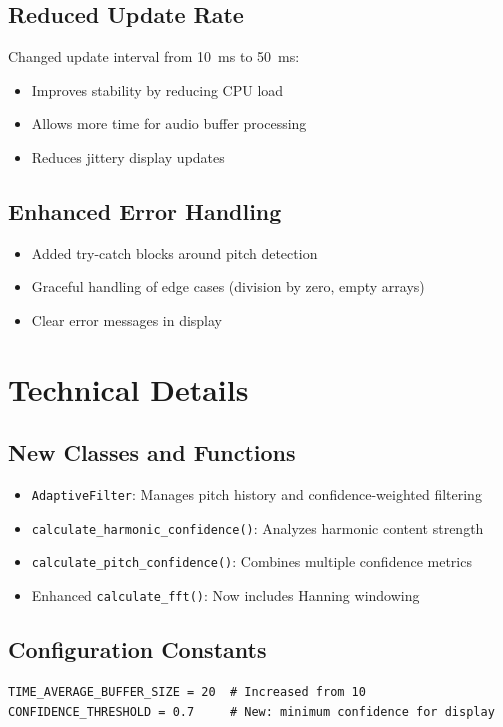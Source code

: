 \documentclass[11pt,a4paper]{article}
\begin{document}
\subsection{Reduced Update Rate}
Changed update interval from \SI{10}{\milli\second} to \SI{50}{\milli\second}:
\begin{itemize}
    \item Improves stability by reducing CPU load
    \item Allows more time for audio buffer processing
    \item Reduces jittery display updates
\end{itemize}

\subsection{Enhanced Error Handling}
\begin{itemize}
    \item Added try-catch blocks around pitch detection
    \item Graceful handling of edge cases (division by zero, empty arrays)
    \item Clear error messages in display
\end{itemize}

\section{Technical Details}

\subsection{New Classes and Functions}
\begin{itemize}
    \item \texttt{AdaptiveFilter}: Manages pitch history and confidence-weighted filtering
    \item \texttt{calculate\_harmonic\_confidence()}: Analyzes harmonic content strength
    \item \texttt{calculate\_pitch\_confidence()}: Combines multiple confidence metrics
    \item Enhanced \texttt{calculate\_fft()}: Now includes Hanning windowing
\end{itemize}

\subsection{Configuration Constants}
\begin{lstlisting}[caption=New Configuration Parameters]
TIME_AVERAGE_BUFFER_SIZE = 20  # Increased from 10
CONFIDENCE_THRESHOLD = 0.7     # New: minimum confidence for display
\end{lstlisting}
\end{document}
